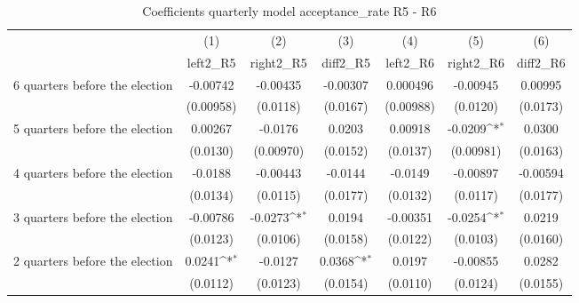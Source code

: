 \begin{table}[htbp]\centering
\def\sym#1{\ifmmode^{#1}\else\(^{#1}\)\fi}
\caption{Coefficients quarterly model acceptance\_rate R5 - R6}
\begin{tabular}{l*{6}{c}}
\hline\hline
                    &\multicolumn{1}{c}{(1)}&\multicolumn{1}{c}{(2)}&\multicolumn{1}{c}{(3)}&\multicolumn{1}{c}{(4)}&\multicolumn{1}{c}{(5)}&\multicolumn{1}{c}{(6)}\\
                    &\multicolumn{1}{c}{left2\_R5}&\multicolumn{1}{c}{right2\_R5}&\multicolumn{1}{c}{diff2\_R5}&\multicolumn{1}{c}{left2\_R6}&\multicolumn{1}{c}{right2\_R6}&\multicolumn{1}{c}{diff2\_R6}\\
\hline
 6 quarters before the election&    -0.00742         &    -0.00435         &    -0.00307         &    0.000496         &    -0.00945         &     0.00995         \\
                    &   (0.00958)         &    (0.0118)         &    (0.0167)         &   (0.00988)         &    (0.0120)         &    (0.0173)         \\
[1em]
 5 quarters before the election&     0.00267         &     -0.0176         &      0.0203         &     0.00918         &     -0.0209\sym{*}  &      0.0300         \\
                    &    (0.0130)         &   (0.00970)         &    (0.0152)         &    (0.0137)         &   (0.00981)         &    (0.0163)         \\
[1em]
 4 quarters before the election&     -0.0188         &    -0.00443         &     -0.0144         &     -0.0149         &    -0.00897         &    -0.00594         \\
                    &    (0.0134)         &    (0.0115)         &    (0.0177)         &    (0.0132)         &    (0.0117)         &    (0.0177)         \\
[1em]
 3 quarters before the election&    -0.00786         &     -0.0273\sym{*}  &      0.0194         &    -0.00351         &     -0.0254\sym{*}  &      0.0219         \\
                    &    (0.0123)         &    (0.0106)         &    (0.0158)         &    (0.0122)         &    (0.0103)         &    (0.0160)         \\
[1em]
 2 quarters before the election&      0.0241\sym{*}  &     -0.0127         &      0.0368\sym{*}  &      0.0197         &    -0.00855         &      0.0282         \\
                    &    (0.0112)         &    (0.0123)         &    (0.0154)         &    (0.0110)         &    (0.0124)         &    (0.0155)         \\

\end{tabular}
\end{table}
